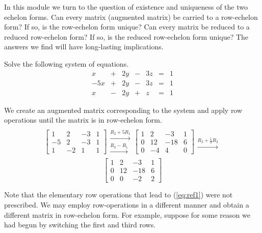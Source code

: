 \documentclass{ximera}
\begin{document}
In this module we turn to the question of existence and uniqueness of the two echelon forms.  Can every matrix (augmented matrix) be carried to a row-echelon form?  If so, is the row-echelon form unique?  Can every matrix be reduced to a reduced row-echelon form?  If so, is the reduced row-echelon form unique?  The answers we find will have long-lasting implications.


\begin{exploration}\label{init:gaussianelim1}
Solve the following system of equations.
$$\begin{array}{ccccccccc}
      x &+ &2y&-&3z&= &1 \\
	 -5x& +&2y&-&3z&=&1\\
      x&- &2y&+&z&=&1
    \end{array}$$

We create an augmented matrix corresponding to the system and apply row operations until the matrix is in row-echelon form.  
$$\left[\begin{array}{ccc|c}  
 1&2&-3&1\\-5&2&-3&1\\1&-2&1&1
 \end{array}\right]
 \begin{array}{c}
 \\
 \xrightarrow{R_2+5R_1}\\
 \xrightarrow{R_3-R_1}\\
 \end{array}
\left[\begin{array}{ccc|c}  
 1&2&-3&1\\0&12&-18&6\\0&-4&4&0
 \end{array}\right]
 \begin{array}{c}
 \\
 \\
 \xrightarrow{R_3+\frac{1}{3}R_2}\\
 \end{array}$$
 \begin{equation}\label{eq:ref1}
 \left[\begin{array}{ccc|c}  
 1&2&-3&1\\0&12&-18&6\\0&0&-2&2
 \end{array}\right]
\end{equation}

Note that the elementary row operations that lead to (\ref{eq:ref1}) were not prescribed.  We may employ row-operations in a different manner and obtain a different matrix in row-echelon form.  For example, suppose for some reason we had begun by switching the first and third rows.


\end{exploration}
\end{document}
